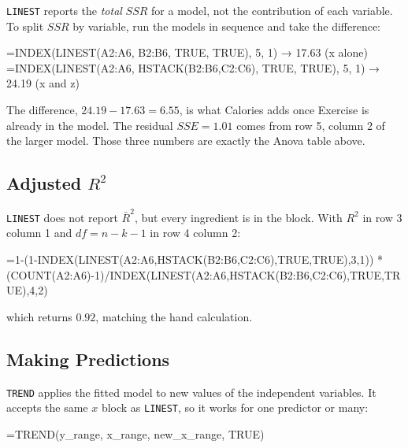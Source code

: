 \documentclass[
  11pt,
  letterpaper,
  DIV=11,
  numbers=noendperiod,
  oneside,
  open=any]{scrreprt}
\newenvironment{Shaded}{\begin{snugshade}}{\end{snugshade}}
\newcommand{\NormalTok}[1]{\textcolor[rgb]{0.00,0.23,0.31}{#1}}
\begin{document}
\texttt{LINEST} reports the \emph{total} \(SSR\) for a model, not the
contribution of each variable. To split \(SSR\) by variable, run the
models in sequence and take the difference:

\begin{Shaded}
\begin{Highlighting}[]
\NormalTok{=INDEX(LINEST(A2:A6, B2:B6, TRUE, TRUE), 5, 1)                      → 17.63   (x alone)}
\NormalTok{=INDEX(LINEST(A2:A6, HSTACK(B2:B6,C2:C6), TRUE, TRUE), 5, 1)        → 24.19   (x and z)}
\end{Highlighting}
\end{Shaded}

The difference, \(24.19-17.63=6.55\), is what Calories adds once
Exercise is already in the model. The residual \(SSE=1.01\) comes from
row 5, column 2 of the larger model. Those three numbers are exactly the
Anova table above.

\subsection*{\texorpdfstring{Adjusted
\(R^2\)}{Adjusted R\^{}2}}\label{adjusted-r2-1}

\texttt{LINEST} does not report \(\bar{R}^2\), but every ingredient is
in the block. With \(R^2\) in row 3 column 1 and \(df=n-k-1\) in row 4
column 2:

\begin{Shaded}
\begin{Highlighting}[]
\NormalTok{=1{-}(1{-}INDEX(LINEST(A2:A6,HSTACK(B2:B6,C2:C6),TRUE,TRUE),3,1))}
\NormalTok{     *(COUNT(A2:A6){-}1)/INDEX(LINEST(A2:A6,HSTACK(B2:B6,C2:C6),TRUE,TRUE),4,2)}
\end{Highlighting}
\end{Shaded}

which returns \(0.92\), matching the hand calculation.

\subsection*{Making Predictions}\label{making-predictions}

\texttt{TREND} applies the fitted model to new values of the independent
variables. It accepts the same \(x\) block as \texttt{LINEST}, so it
works for one predictor or many:

\begin{Shaded}
\begin{Highlighting}[]
\NormalTok{=TREND(y\_range, x\_range, new\_x\_range, TRUE)}
\end{Highlighting}
\end{Shaded}
\end{document}
